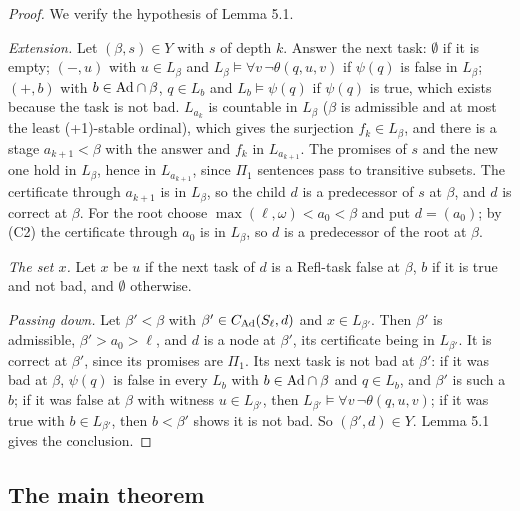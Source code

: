 \documentclass[11pt]{article}
\begin{document}
\begin{proof}
We verify the hypothesis of Lemma 5.1.

\emph{Extension.} Let $(\beta, s) \in Y$ with $s$ of depth $k$. Answer the next task: $\emptyset$ if it is empty; $(-,
u)$ with $u \in L_\beta$ and $L_\beta \models \forall v\, \neg\theta(q,u,v)$ if $\psi(q)$ is false in $L_\beta$; $(+,
b)$ with $b \in \mathrm{Ad} \cap \beta$, $q \in L_b$ and $L_b \models \psi(q)$ if $\psi(q)$ is true, which exists because the
task is not bad. $L_{a_k}$ is countable in $L_\beta$ ($\beta$ is admissible and at most the least (+1)-stable ordinal), which gives the
surjection $f_k \in L_\beta$, and there is a stage $a_{k+1} < \beta$ with the answer and $f_k$ in $L_{a_{k+1}}$. The
promises of $s$ and the new one hold in $L_\beta$, hence in $L_{a_{k+1}}$, since $\Pi_1$ sentences pass to transitive
subsets. The certificate through $a_{k+1}$ is in $L_\beta$, so the child $d$ is a predecessor of $s$ at $\beta$, and
$d$ is correct at $\beta$. For the root choose $\max(\ell, \omega) < a_0 < \beta$ and put $d = (a_0)$; by (C2) the
certificate through $a_0$ is in $L_\beta$, so $d$ is a predecessor of the root at $\beta$.

\emph{The set $x$.} Let $x$ be $u$ if the next task of $d$ is a Refl-task false at $\beta$, $b$ if it is true and
not bad, and $\emptyset$ otherwise.

\emph{Passing down.} Let $\beta' < \beta$ with $\beta' \in C_{\mathrm{Ad}}(S_\ell, d)$ and $x \in L_{\beta'}$. Then $\beta'$ is
admissible, $\beta' > a_0 > \ell$, and $d$ is a node at $\beta'$, its certificate being in $L_{\beta'}$. It is correct
at $\beta'$, since its promises are $\Pi_1$. Its next task is not bad at $\beta'$: if it was bad at $\beta$, $\psi(q)$
is false in every $L_b$ with $b \in \mathrm{Ad} \cap \beta$ and $q \in L_b$, and $\beta'$ is such a $b$; if it was false at
$\beta$ with witness $u \in L_{\beta'}$, then $L_{\beta'} \models \forall v\, \neg\theta(q,u,v)$; if it was true with
$b \in L_{\beta'}$, then $b < \beta'$ shows it is not bad. So $(\beta', d) \in Y$. Lemma 5.1 gives the conclusion.
\end{proof}

\subsection{The main theorem}
\end{document}
